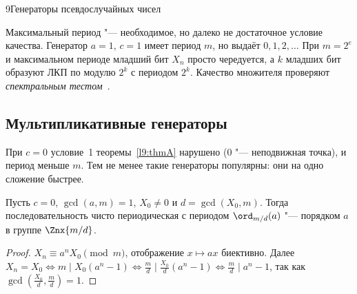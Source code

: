 \begin{lecture}{9}{Генераторы псевдослучайных чисел}

\begin{remark}
Максимальный период "--- необходимое, но далеко не достаточное условие качества. Генератор
$a = 1$, $c = 1$ имеет период $m$, но выдаёт $0, 1, 2, \dots$ При $m = 2^e$ и максимальном периоде
младший бит $X_n$ просто чередуется, а $k$ младших бит образуют ЛКП по модулю $2^k$ с периодом
$2^k$. Качество множителя проверяют \emph{спектральным тестом}~\cite[разд.~3.3.4]{knuth-taocp2}.
\end{remark}


\subsection{Мультипликативные генераторы}

При $c = 0$ условие~1 теоремы~\ref{l9:thmA} нарушено ($0$ "--- неподвижная точка), и период меньше
$m$. Тем не менее такие генераторы популярны: они на одно сложение быстрее.

\begin{proposition}\label{l9:mult}
Пусть $c = 0$, $\gcd(a, m) = 1$, $X_0 \ne 0$ и $d = \gcd(X_0, m)$. Тогда последовательность чисто
периодическая с периодом $\ord_{m/d}(a)$ "--- порядком $a$ в группе $\Znx{m/d}$.
\end{proposition}

\begin{proof}
$X_n \equiv a^n X_0 \pmod m$, отображение $x \mapsto ax$ биективно. Далее
$X_n = X_0 \iff m \mid X_0 (a^n - 1) \iff \frac md \mid \frac{X_0}{d} (a^n - 1) \iff
\frac md \mid a^n - 1$, так как $\gcd(\frac{X_0}{d}, \frac md) = 1$.
\end{proof}


\end{lecture}
